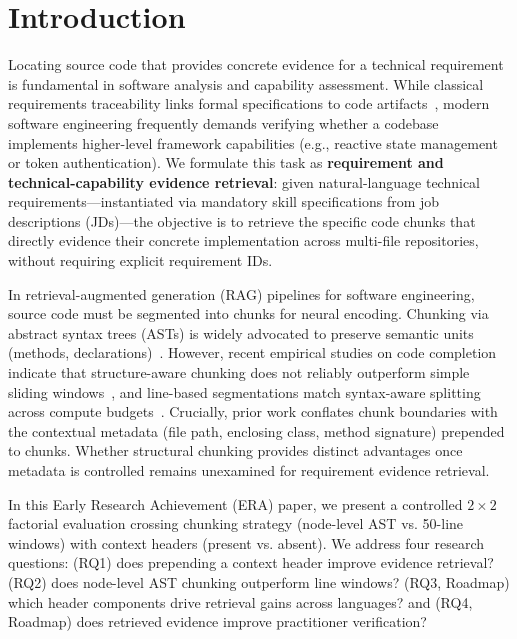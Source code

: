 \section{Introduction}
\label{sec:intro}

Locating source code that provides concrete evidence for a technical requirement is fundamental in software analysis and capability assessment. 
While classical requirements traceability links formal specifications to code artifacts~\cite{antoniol2002traceability,gao2024triad}, modern software engineering frequently demands verifying whether a codebase implements higher-level framework capabilities (e.g., reactive state management or token authentication). 
We formulate this task as \textbf{requirement and technical-capability evidence retrieval}: given natural-language technical requirements---instantiated via mandatory skill specifications from job descriptions (JDs)---the objective is to retrieve the specific code chunks that directly evidence their concrete implementation across multi-file repositories, without requiring explicit requirement IDs.

In retrieval-augmented generation (RAG) pipelines for software engineering, source code must be segmented into chunks for neural encoding. 
Chunking via abstract syntax trees (ASTs) is widely advocated to preserve semantic units (methods, declarations)~\cite{zhang2025cast}. 
However, recent empirical studies on code completion indicate that structure-aware chunking does not reliably outperform simple sliding windows~\cite{wu2026chunking}, and line-based segmentations match syntax-aware splitting across compute budgets~\cite{galimzyanov2025practical}. 
Crucially, prior work conflates chunk boundaries with the contextual metadata (file path, enclosing class, method signature) prepended to chunks. 
Whether structural chunking provides distinct advantages once metadata is controlled remains unexamined for requirement evidence retrieval.

In this Early Research Achievement (ERA) paper, we present a controlled $2 \times 2$ factorial evaluation crossing chunking strategy (node-level AST vs. 50-line windows) with context headers (present vs. absent). We address four research questions: (RQ1) does prepending a context header improve evidence retrieval? (RQ2) does node-level AST chunking outperform line windows? (RQ3, Roadmap) which header components drive retrieval gains across languages? and (RQ4, Roadmap) does retrieved evidence improve practitioner verification?

